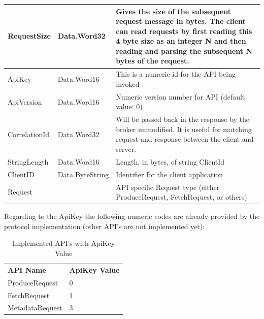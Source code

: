 \begin{table}[H]
\centering
\begin{tabular}{ l  l  p{10cm} }
\hline
RequestSize   & Data.Word32     & Gives the size of the subsequent request message in bytes. The client can read requests by first reading this 4 byte size as an integer N and then reading and parsing the subsequent N bytes of the request. \\ \hline
ApiKey        & Data.Word16     & This is a numeric id for the API being invoked                                                                                                                                                              \\ \hline
ApiVersion    & Data.Word16     & Numeric version number for API (default value: 0)                                                                                                                                                                          \\ \hline
CorrelationId & Data.Word32     & Will be passed back in the response by the broker unmodified. It is useful for matching request and response between the client and server.                                                                   \\ \hline
StringLength  & Data.Word16     & Length, in bytes, of string ClientId                                                                                                                                                                          \\ \hline
ClientID      & Data.ByteString & Identifier for the client application                                                                                                                                                                         \\ \hline
Request       &                 & API specific Request type (either ProduceRequest, FetchRequest, or others)                                                                                                                                    \\ \hline
\end{tabular}
\end{table}

Regarding to the ApiKey the following numeric codes are already provided by the
protocol implementation (other API's are not implemented yet): 
\begin{table}[h]
    \centering
    \begin{tabular}{ll}
        {\bf API Name}  & {\bf ApiKey Value} \\
        ProduceRequest  & 0                  \\
        FetchRequest    & 1                  \\
        MetadataRequest & 3                 
    \end{tabular}
    \caption{Implemented API's with ApiKey Value}
\end{table}


